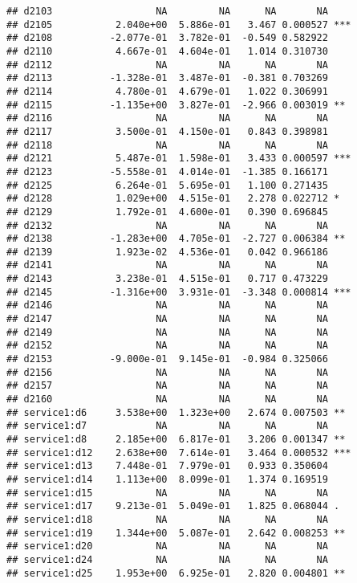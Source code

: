 \documentclass[
]{article}
\begin{document}
\begin{verbatim}
## d2103                  NA         NA      NA       NA    
## d2105           2.040e+00  5.886e-01   3.467 0.000527 ***
## d2108          -2.077e-01  3.782e-01  -0.549 0.582922    
## d2110           4.667e-01  4.604e-01   1.014 0.310730    
## d2112                  NA         NA      NA       NA    
## d2113          -1.328e-01  3.487e-01  -0.381 0.703269    
## d2114           4.780e-01  4.679e-01   1.022 0.306991    
## d2115          -1.135e+00  3.827e-01  -2.966 0.003019 ** 
## d2116                  NA         NA      NA       NA    
## d2117           3.500e-01  4.150e-01   0.843 0.398981    
## d2118                  NA         NA      NA       NA    
## d2121           5.487e-01  1.598e-01   3.433 0.000597 ***
## d2123          -5.558e-01  4.014e-01  -1.385 0.166171    
## d2125           6.264e-01  5.695e-01   1.100 0.271435    
## d2128           1.029e+00  4.515e-01   2.278 0.022712 *  
## d2129           1.792e-01  4.600e-01   0.390 0.696845    
## d2132                  NA         NA      NA       NA    
## d2138          -1.283e+00  4.705e-01  -2.727 0.006384 ** 
## d2139           1.923e-02  4.536e-01   0.042 0.966186    
## d2141                  NA         NA      NA       NA    
## d2143           3.238e-01  4.515e-01   0.717 0.473229    
## d2145          -1.316e+00  3.931e-01  -3.348 0.000814 ***
## d2146                  NA         NA      NA       NA    
## d2147                  NA         NA      NA       NA    
## d2149                  NA         NA      NA       NA    
## d2152                  NA         NA      NA       NA    
## d2153          -9.000e-01  9.145e-01  -0.984 0.325066    
## d2156                  NA         NA      NA       NA    
## d2157                  NA         NA      NA       NA    
## d2160                  NA         NA      NA       NA    
## service1:d6     3.538e+00  1.323e+00   2.674 0.007503 ** 
## service1:d7            NA         NA      NA       NA    
## service1:d8     2.185e+00  6.817e-01   3.206 0.001347 ** 
## service1:d12    2.638e+00  7.614e-01   3.464 0.000532 ***
## service1:d13    7.448e-01  7.979e-01   0.933 0.350604    
## service1:d14    1.113e+00  8.099e-01   1.374 0.169519    
## service1:d15           NA         NA      NA       NA    
## service1:d17    9.213e-01  5.049e-01   1.825 0.068044 .  
## service1:d18           NA         NA      NA       NA    
## service1:d19    1.344e+00  5.087e-01   2.642 0.008253 ** 
## service1:d20           NA         NA      NA       NA    
## service1:d24           NA         NA      NA       NA    
## service1:d25    1.953e+00  6.925e-01   2.820 0.004801 ** 

\end{verbatim}
\end{document}
